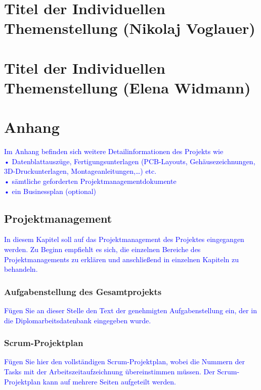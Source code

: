 \documentclass{article}
\begin{document}
\section{Titel der Individuellen Themenstellung (Nikolaj Voglauer)}

\newpage
\section{Titel der Individuellen Themenstellung (Elena Widmann)}

\newpage
\section{Anhang}
\textcolor{blue}{Im Anhang befinden sich weitere Detailinformationen des Projekts wie\\
•	Datenblattauszüge, Fertigungsunterlagen (PCB-Layouts, Gehäusezeichnungen, 3D-Druckunterlagen, Montageanleitungen,…) etc.\\
•	sämtliche geforderten Projektmanagementdokumente\\
•	ein Businessplan (optional)
}

\subsection{Projektmanagement}
\textcolor{blue}{In diesem Kapitel soll auf das Projektmanagement des Projektes eingegangen werden. Zu Beginn empfiehlt es sich, die einzelnen Bereiche des Projektmanagements zu erklären und anschließend in einzelnen Kapiteln zu behandeln.}

\subsubsection{Aufgabenstellung des Gesamtprojekts}
\textcolor{blue}{Fügen Sie an dieser Stelle den Text der genehmigten Aufgabenstellung ein, der in die Diplomarbeitsdatenbank  eingegeben wurde.}

\subsubsection{Scrum-Projektplan}
\textcolor{blue}{Fügen Sie hier den vollständigen Scrum-Projektplan, wobei die Nummern der Tasks mit der Arbeitszeitaufzeichnung übereinstimmen müssen. Der Scrum-Projektplan kann auf mehrere Seiten aufgeteilt werden.}
\end{document}
